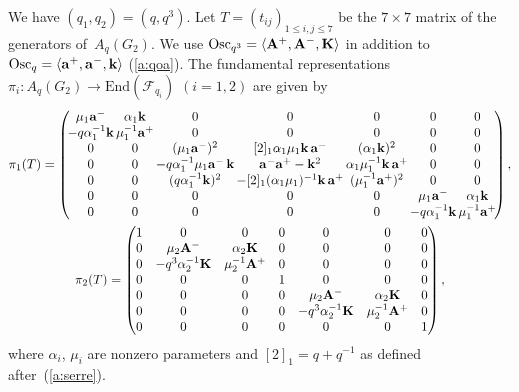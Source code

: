 We have $(q_1,q_2)=(q,q^3)$.
Let $T=(t_{ij})_{1\le i,j \le 7}$ be the
$7\times 7$ matrix of the generators of~$A_q(G_2)$.
We  use
$\mathrm{Osc}_{q^3} =
\langle  {\rm{\bf A}}^+, {\rm{\bf A}}^-, {\rm{\bf K}} \rangle$
in addition to
$\mathrm{Osc}_q =
\langle  {\rm{\bf a}}^+, {\rm{\bf a}}^-, {\rm{\bf k}} \rangle$
(\ref{a:qoa}).
The fundamental representations
$\pi_i: A_q(G_2) \rightarrow \mathrm{End}(\mathcal{F}_{q_i})$
$(i=1,2)$ are given by{\samepage
\begin{gather}
 \pi_1(T)=
 \left(\!
\begin{array}{@{}c@{\,}c@{\,}c@{\,}c@{\,}c@{\,}c@{\,}c@{}}
\mu_1 {\rm{\bf a}}^- & \alpha_1 {\rm{\bf k}} &  0 & 0 & 0 & 0 &0 \\
-q\alpha^{-1}_1{\rm{\bf k}} & \mu^{-1}_1{\rm{\bf a}}^+ & 0 & 0&0 & 0& 0\\
0&0 & (\mu_1{\rm{\bf a}}^-)^2 &
[2]_1\alpha_1\mu_1 {\rm{\bf k}}\, {\rm{\bf a}}^- & (\alpha_1{\rm{\bf k}})^2 & 0& 0\\
0 & 0& -q\alpha_1^{-1}\mu_1{\rm{\bf a}}^- \,{\rm{\bf k}} &
{\rm{\bf a}}^- {\rm{\bf a}}^+ - {\rm{\bf k}}^2 & \alpha_1\mu^{-1}_1{\rm{\bf k}}
\,{\rm{\bf a}}^+ & 0& 0\\
0& 0& (q\alpha_1^{-1}{\rm{\bf k}})^2 &
-[2]_1(\alpha_1\mu_1)^{-1} {\rm{\bf k}}
\,{\rm{\bf a}}^+ & (\mu_1^{-1}{\rm{\bf a}}^+)^2 & 0& 0\\
0&0&0&0&0& \mu_1{\rm{\bf a}}^- & \alpha_1{\rm{\bf k}} \\
0&0&0&0&0& -q\alpha_1^{-1}{\rm{\bf k}} & \mu_1^{-1}{\rm{\bf a}}^+
 \end{array}
\!\right)
 , \nonumber\\
\pi_2(T)=
\begin{pmatrix}
1&  0&  0& 0& 0& 0&0\\
 0& \mu_2{\rm{\bf A}}^- & \alpha_2 {\rm{\bf K}} &0 &0 &0 &0 \\
 0& -q^3\alpha_2^{-1} {\rm{\bf K}} & \mu_2^{-1} {\rm{\bf A}}^+ & 0& 0& 0&0\\
0 &0 & 0& 1& 0&0 &0\\
 0& 0& 0& 0& \mu_2 {\rm{\bf A}}^- & \alpha_2 {\rm{\bf K}} & 0\\
0 & 0& 0& 0& -q^3\alpha^{-1}_2 {\rm{\bf K}} & \mu_2^{-1} {\rm{\bf A}}^+ & 0\\
 0&0&0&0&0&0& 1
 \end{pmatrix},\label{a:piTg}
\end{gather}
where $\alpha_i$, $\mu_i$ are nonzero parameters
and $[2]_1=q+q^{-1}$ as def\/ined after~(\ref{a:serre}).}

